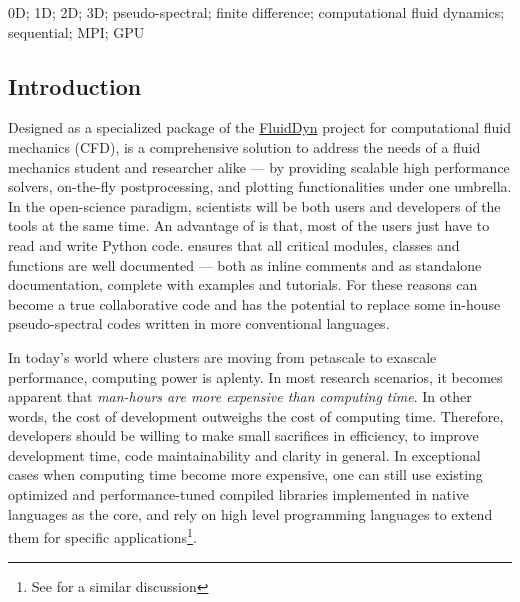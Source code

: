 0D; 1D; 2D; 3D; pseudo-spectral; finite difference; computational fluid
dynamics; sequential; MPI; GPU

\subsection{Introduction}


Designed as a specialized package of the
\href{https://fluiddyn.readthedocs.io}{FluidDyn} project for computational fluid
mechanics (CFD),  is a comprehensive solution to address the needs
of a fluid mechanics student and researcher alike --- by providing scalable high
performance solvers, on-the-fly postprocessing, and plotting functionalities under
one umbrella.  In the open-science paradigm, scientists will be both users and
developers of the tools at the same time.
%
An advantage of  is that, most of the users just have to read and
write Python code.   ensures that all critical modules, classes and
functions are well documented --- both as inline comments and as standalone
documentation, complete with examples and tutorials.  For these reasons
 can become a true collaborative code and has the potential to
replace some in-house pseudo-spectral codes written in more conventional
languages.

In today's world where clusters are moving from petascale to exascale
performance, computing power is aplenty. In most research scenarios, it becomes
apparent that \emph{man-hours are more expensive than computing time}. In other
words, the cost of development outweighs the cost of computing time. Therefore,
developers should be willing to make small sacrifices in efficiency, to improve
development time, code maintainability and clarity in general. In exceptional
cases when computing time become more expensive, one can still use
existing optimized and performance-tuned compiled libraries implemented in
native languages as the core, and rely on high level programming languages to
extend them for specific applications\footnote{See
  \citet{ramachandran_pysph_2016} for a similar discussion}.

